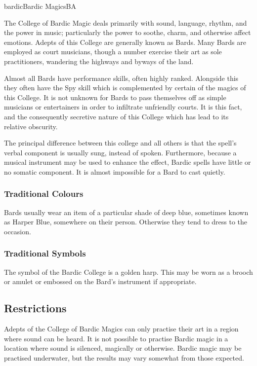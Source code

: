 \begin{college}[2.1]{bardic}{Bardic Magics}{BA}

The College of Bardic Magic deals primarily with sound, language,
rhythm, and the power in music; particularly the power to soothe,
charm, and otherwise affect emotions. Adepts of this College are
generally known as Bards.  Many Bards are employed as court musicians,
though a number exercise their art as sole practitioners, wandering
the highways and byways of the land.

Almost all Bards have performance skills, often highly ranked.
Alongside this they often have the Spy skill which is complemented by
certain of the magics of this College. It is not unknown for Bards to
pass themselves off as simple musicians or entertainers in order to
infiltrate unfriendly courts. It is this fact, and the consequently
secretive nature of this College which has lead to its relative
obscurity.

The principal difference between this college and all others is that
the spell's verbal component is usually sung, instead of spoken.
Furthermore, because a musical instrument may be used to enhance the
effect, Bardic spells have little or no somatic component. It is
almost impossible for a Bard to cast quietly.

\subsubsection{Traditional Colours}

Bards usually wear an item of a particular shade of deep blue,
sometimes known as Harper Blue, somewhere on their person.  Otherwise
they tend to dress to the occasion.

\subsubsection{Traditional Symbols}

The symbol of the Bardic College is a golden harp. This may be worn as
a brooch or amulet or embossed on the Bard's instrument if
appropriate.

\subsection{Restrictions}

Adepts of the College of Bardic Magics can only practise their art in
a region where sound can be heard. It is not possible to practise
Bardic magic in a location where sound is silenced, magically or
otherwise. Bardic magic may be practised underwater, but the results
may vary somewhat from those expected.


\end{college}
